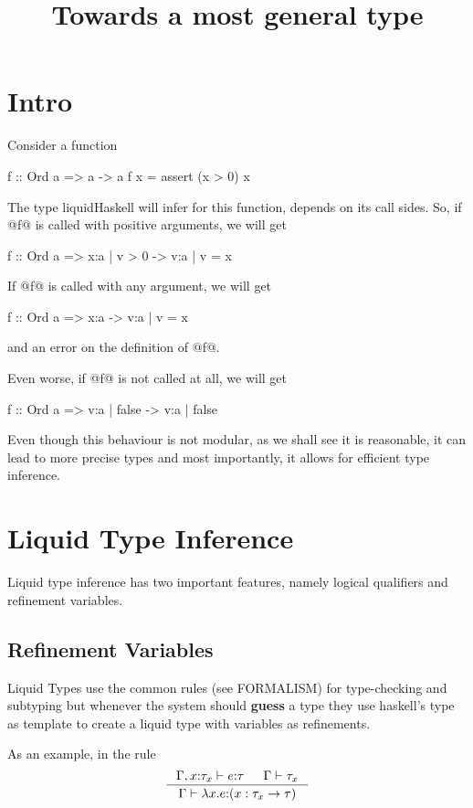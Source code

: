 \documentclass[10pt,a4paper]{article}
\title{Towards a most general type}
\newcommand\hastype[3]{\ensuremath{#1 \vdash #2 \colon #3}}
\newcommand\iswellformed[2]{\ensuremath{#1 \vdash #2}}
\begin{document}
\maketitle
\section*{Intro}
Consider a function 
\begin{code}
f :: Ord a => a -> a
f x = assert (x > 0) x
\end{code}

The type liquidHaskell will infer for this function, 
depends on its call sides.
%
So, if @f@ is called with positive arguments, 
we will get
\begin{code}
f :: Ord a => {x:a | v > 0} -> {v:a | v = x}
\end{code}

If @f@ is called with any argument, 
we will get
\begin{code}
f :: Ord a => x:a -> {v:a | v = x}
\end{code}
and an error on the definition of @f@.

Even worse, if @f@ is not called at all, 
we will get
\begin{code}
f :: Ord a => {v:a | false} -> {v:a | false}
\end{code}

Even though this behaviour is not modular,
as we shall see it is reasonable, 
it can lead to more precise types and
most importantly, it allows for 
efficient type inference.  

\section*{Liquid Type Inference}
Liquid type inference has two important features, 
namely logical qualifiers and refinement variables.

\subsection*{Refinement Variables}
Liquid Types use the common rules (see FORMALISM) for type-checking and subtyping 
but whenever the system should \textbf{guess} a type
they use haskell's type as template to create a liquid type with 
variables as refinements.

As an example, in the rule
$$
\inference{
	\hastype{\Gamma, x\colon\tau_x}{e}{\tau} &&
	\iswellformed{\Gamma}{\tau_x}
}{
	\hastype{\Gamma}{\lambda x . e}{(x:\tau_x \rightarrow \tau)}
}
$$
\end{document}
